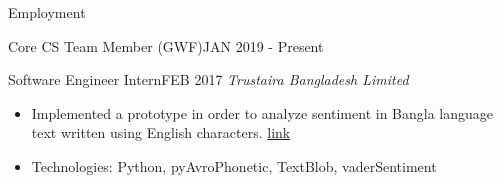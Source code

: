 \documentclass[]{mcdowellcv}
\begin{document}
\begin{cvsection}{Employment}
\begin{cvsubsection}{Core CS Team Member (GWF)}{}{JAN 2019 - Present}
\begin{itemize}
    	    \end{itemize}
    	
        \end{cvsubsection}
	
    	\begin{cvsubsection}{Software Engineer Intern}{}{FEB 2017}
    	\emph{Trustaira Bangladesh Limited}
    	    \begin{itemize}
    	        \item Implemented a prototype in order to analyze sentiment in Bangla language text written using English characters. \href{https://techfoxweb.wordpress.com/2017/07/24/banglish-sentiment-analysis/}{link}
    	        \item Technologies: Python, pyAvroPhonetic, TextBlob, vaderSentiment 
    	        
    	    \end{itemize}
    	
    	\end{cvsubsection}
    	
    
        
    	        
    	
	
	
	
	\end{cvsection}
	
\end{document}
